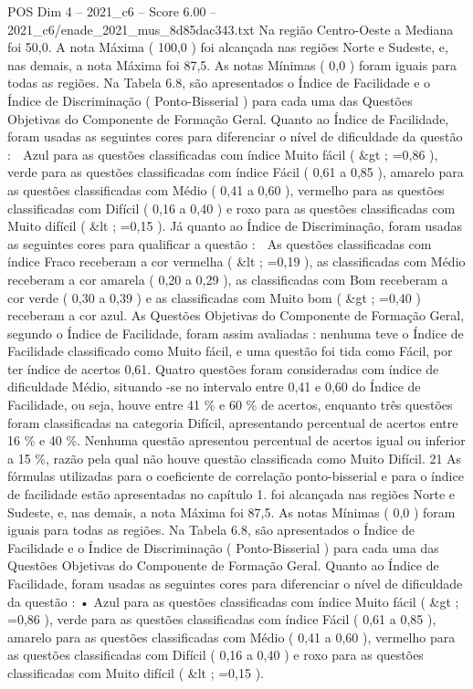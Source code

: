 \begin{textsample}{POS Dim 4 – 2021\_c6 – Score 6.00 – 2021\_c6/enade\_2021\_mus\_8d85dac343.txt}
Na região Centro-Oeste a Mediana foi 50,0.
A nota Máxima ( 100,0 ) foi alcançada nas regiões Norte e Sudeste, e, nas demais, a nota Máxima foi 87,5.
As notas Mínimas ( 0,0 ) foram iguais para todas as regiões.
Na Tabela 6.8, são apresentados o Índice de Facilidade e o Índice de Discriminação ( Ponto-Bisserial ) para cada uma das Questões Objetivas do Componente de Formação Geral.
Quanto ao Índice de Facilidade, foram usadas as seguintes cores para diferenciar o nível de dificuldade da questão :  Azul para as questões classificadas com índice Muito fácil ( \&gt ; =0,86 ), verde para as questões classificadas com índice Fácil ( 0,61 a 0,85 ), amarelo para as questões classificadas com Médio ( 0,41 a 0,60 ), vermelho para as questões classificadas com Difícil ( 0,16 a 0,40 ) e roxo para as questões classificadas com Muito difícil ( \&lt ; =0,15 ).
Já quanto ao Índice de Discriminação, foram usadas as seguintes cores para qualificar a questão :  As questões classificadas com índice Fraco receberam a cor vermelha ( \&lt ; =0,19 ), as classificadas com Médio receberam a cor amarela ( 0,20 a 0,29 ), as classificadas com Bom receberam a cor verde ( 0,30 a 0,39 ) e as classificadas com Muito bom ( \&gt ; =0,40 ) receberam a cor azul.
As Questões Objetivas do Componente de Formação Geral, segundo o Índice de Facilidade, foram assim avaliadas : nenhuma teve o Índice de Facilidade classificado como Muito fácil, e uma questão foi tida como Fácil, por ter índice de acertos 0,61.
Quatro questões foram consideradas com índice de dificuldade Médio, situando -se no intervalo entre 0,41 e 0,60 do Índice de Facilidade, ou seja, houve entre 41 \% e 60 \% de acertos, enquanto três questões foram classificadas na categoria Difícil, apresentando percentual de acertos entre 16 \% e 40 \%.
Nenhuma questão apresentou percentual de acertos igual ou inferior a 15 \%, razão pela qual não houve questão classificada como Muito Difícil. 21 As fórmulas utilizadas para o coeficiente de correlação ponto-bisserial e para o índice de facilidade estão apresentadas no capítulo 1. foi alcançada nas regiões Norte e Sudeste, e, nas demais, a nota Máxima foi 87,5.
As notas Mínimas ( 0,0 ) foram iguais para todas as regiões.
Na Tabela 6.8, são apresentados o Índice de Facilidade e o Índice de Discriminação ( Ponto-Bisserial ) para cada uma das Questões Objetivas do Componente de Formação Geral.
Quanto ao Índice de Facilidade, foram usadas as seguintes cores para diferenciar o nível de dificuldade da questão : • Azul para as questões classificadas com índice Muito fácil ( \&gt ; =0,86 ), verde para as questões classificadas com índice Fácil ( 0,61 a 0,85 ), amarelo para as questões classificadas com Médio ( 0,41 a 0,60 ), vermelho para as questões classificadas com Difícil ( 0,16 a 0,40 ) e roxo para as questões classificadas com Muito difícil ( \&lt ; =0,15 ).

\end{textsample}
